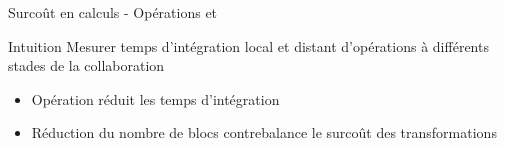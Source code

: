 \begin{frame}{Surcoût en calculs - Opérations \ins et \rmv}
    \begin{block}{Intuition}
        Mesurer temps d'intégration \alert{local} et \alert{distant} d'opérations \ins à différents stades de la collaboration
    \end{block}
    \pause
    \vspace{-0.5cm}
    \begin{figure}[!ht]
        \centering
    \end{figure}
    \vspace{-0.3cm}
    \begin{itemize}
        \item<3-> Opération \ren \alert{réduit les temps d'intégration}
        \item<4> Réduction du nombre de blocs contrebalance le surcoût des transformations
    \end{itemize}
\end{frame}

